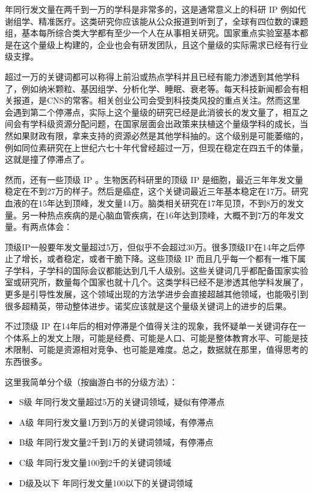 \documentclass[
]{book}
\begin{document}
年同行发文量在两千到一万的学科是非常多的，这是通常意义上的科研 IP 例如代谢组学、精准医疗。这类研究你应该能从公众报道到听到了，全球有四位数的课题组，基本每所综合类大学都有至少一个人在从事相关研究。国家重点实验室基本都是在这个量级上构建的，企业也会有研发团队，且这个量级的实际需求已经有行业级支撑。

超过一万的关键词都可以称得上前沿或热点学科并且已经有能力渗透到其他学科了，例如纳米颗粒、基因组学、分析化学、睡眠、衰老等。每天科技新闻都会有相关报道，是CNS的常客。相关创业公司会受到科技类风投的重点关注。然而这里会遇到第二个停滞点，实际上这个量级的研究已经是此消彼长的发文量了，相互之间会有学科级资源分配问题，在国家层面会出政策来扶植这个量级学科的成长，当然如果财政有限，拿来支持的资源必然是其他学科抽的。这个级别是可能萎缩的，例如同位素研究在上世纪六七十年代曾经超过一万，但现在稳定在四五千的体量，这就是撞了停滞点了。

然而，还有一些顶级 IP 。生物医药科研里的顶级 IP 是细胞，最近三年年发文量稳定在不到27万的样子。然后是癌症，这个关键词最近三年基本稳定在17万。研究血液的在15年达到顶峰，发文量14万。脑类相关研究在17年见顶，不到8万的发文量。另一种热点疾病的是心脑血管疾病，在16年达到顶峰，大概不到7万的年发文量。有两点体会：

顶级IP一般要年发文量超过5万，但似乎不会超过30万。很多顶级IP在14年之后停止了增长，或者稳定，或者干脆下降。这些顶级 IP 而且几乎每一个都有一堆下属子学科，子学科的国际会议都能达到几千人级别。这些关键词几乎都配备国家实验室或研究所，数量每个国家也就十几个。这类学科已经不是渗透其他学科发展了，更多是引导性发展，这个领域出现的方法学进步会直接超越其他领域，也能吸引到很多超精英，带动整体进步。诺奖应该就是这个量级关键词上的进步的后果。

不过顶级 IP 在14年后的相对停滞是个值得关注的现象，我怀疑单一关键词存在一个体系上的发文上限，可能是经费、可能是人口、可能是整体教育水平、可能是技术限制、可能是资源相对竞争、也可能是难度。总之，数据就在那里，值得思考的东西很多。

这里我简单分个级（按幽游白书的分级方法）：

\begin{itemize}
\item
  S级 年同行发文量超过5万的关键词领域，疑似有停滞点
\item
  A级 年同行发文量1万到5万的关键词领域，有停滞点
\item
  B级 年同行发文量2千到1万的关键词领域，有停滞点
\item
  C级 年同行发文量100到2千的关键词领域
\item
  D级及以下 年同行发文量100以下的关键词领域
\end{itemize}
\end{document}

